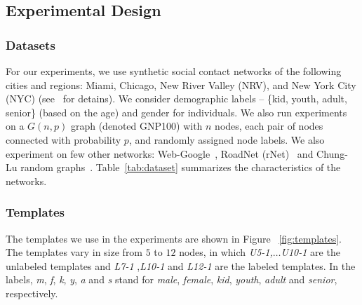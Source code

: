 \subsection{Experimental Design}
\label{sec:datasets-comp}

\subsubsection{Datasets}
For our experiments, we use synthetic social contact networks of the following
cities and regions: Miami, Chicago, New River Valley (NRV), and New York City
(NYC) (see~\cite{barrett2009generation} for detains). We consider demographic
labels -- \{kid, youth, adult, senior\} (based on the age) and gender for
individuals.  We also run experiments on a $G(n,p)$ graph (denoted GNP100) with
$n$ nodes, each pair of nodes connected with probability $p$, and randomly
assigned node labels. We also experiment on few other networks: Web-Google~\cite{snap},
RoadNet (rNet)~\cite{snap} and Chung-Lu random graphs~\cite{chung2002connected}.  Table~\ref{tab:dataset} summarizes the
characteristics of the networks.

\begin{table}[hptb]
\caption{Networks used in the experiments}
\label{tab:dataset}
\end{table}

\subsubsection{Templates}
The templates we use in the experiments are shown in Figure
~\ref{fig:templates}. The templates vary in size from $5$ to $12$
nodes, in which \emph{U5-1,}$\ldots$\emph{U10-1} are the unlabeled templates
and \emph{L7-1} ,\emph{L10-1} and \emph{L12-1} are the labeled templates. In
the labels, \emph{m}, \emph{f}, \emph{k}, \emph{y}, \emph{a} and \emph{s} stand
for \emph{male}, \emph{female}, \emph{kid}, \emph{youth}, \emph{adult} and
\emph{senior}, respectively.

